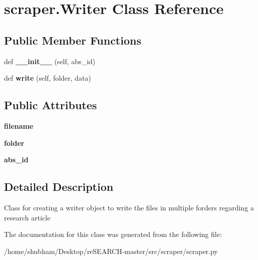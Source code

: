 \hypertarget{classscraper_1_1_writer}{}\section{scraper.\+Writer Class Reference}
\label{classscraper_1_1_writer}
\subsection*{Public Member Functions}
\begin{DoxyCompactItemize}
\item 
def {\bfseries \+\_\+\+\_\+init\+\_\+\+\_\+} (self, abs\+\_\+id)\hypertarget{classscraper_1_1_writer_afa724461d579e43f6470d7166db1288b}{}\label{classscraper_1_1_writer_afa724461d579e43f6470d7166db1288b}

\item 
def {\bfseries write} (self, folder, data)\hypertarget{classscraper_1_1_writer_a2b0261659fc51fc3c9fa37231d87d6c7}{}\label{classscraper_1_1_writer_a2b0261659fc51fc3c9fa37231d87d6c7}

\end{DoxyCompactItemize}
\subsection*{Public Attributes}
\begin{DoxyCompactItemize}
\item 
{\bfseries filename}\hypertarget{classscraper_1_1_writer_a5e6006cfece3245121900edb8054de7e}{}\label{classscraper_1_1_writer_a5e6006cfece3245121900edb8054de7e}

\item 
{\bfseries folder}\hypertarget{classscraper_1_1_writer_a24df154d5f014a262fad63a36036a861}{}\label{classscraper_1_1_writer_a24df154d5f014a262fad63a36036a861}

\item 
{\bfseries abs\+\_\+id}\hypertarget{classscraper_1_1_writer_a56b4acdfb9dc914f431d51dacd60e463}{}\label{classscraper_1_1_writer_a56b4acdfb9dc914f431d51dacd60e463}

\end{DoxyCompactItemize}


\subsection{Detailed Description}
\begin{DoxyVerb}Class for creating a writer object to write the
    files in multiple forders regarding a research article\end{DoxyVerb}
 

The documentation for this class was generated from the following file\+:\begin{DoxyCompactItemize}
\item 
/home/shubham/\+Desktop/re\+S\+E\+A\+R\+C\+H-\/master/src/scraper/scraper.\+py\end{DoxyCompactItemize}
